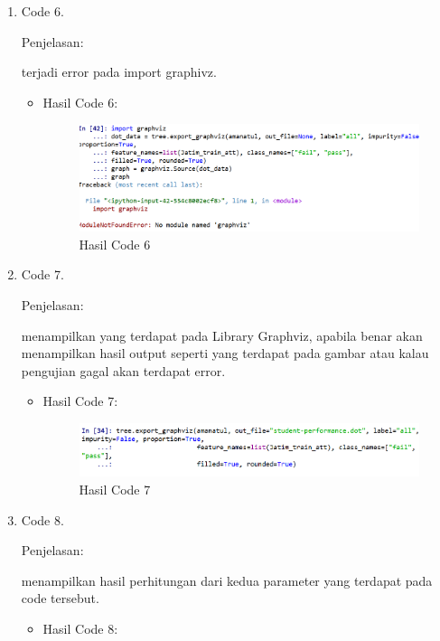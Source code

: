 \begin{enumerate}
\begin{itemize}
\end{itemize}

\item Code 6.
\par Penjelasan:
\par 
terjadi error pada import graphivz.
\begin{itemize}
\par
\item Hasil Code 6:

\begin{figure}[ht]
\centering
\includegraphics[scale=0.4]{figures/andi/gg6.PNG}
\caption{Hasil Code 6}
\label{contoh}
\end{figure}

\end{itemize}


\item Code 7.
\par Penjelasan:
\par 
menampilkan yang terdapat pada Library Graphviz, apabila benar akan menampilkan hasil output seperti yang terdapat pada gambar atau kalau pengujian gagal akan terdapat error.
\begin{itemize}
\par
\item Hasil Code 7:

\begin{figure}[ht]
\centering
\includegraphics[scale=0.4]{figures/andi/gg7.PNG}
\caption{Hasil Code 7}
\label{contoh}
\end{figure}

\end{itemize}

\item Code 8.
\par Penjelasan:
\par 
menampilkan hasil perhitungan dari kedua parameter yang terdapat pada code tersebut.
\begin{itemize}
\par
\item Hasil Code 8:


\end{itemize}
\end{enumerate}
